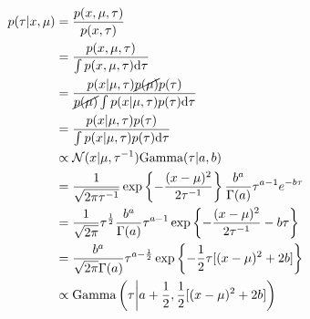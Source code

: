 \documentclass{amsmlaj}
\begin{document}
\begin{problem}
\begin{sol}
\begin{align}
		p(\tau|x,\mu)
		&=\frac{p(x,\mu,\tau)}{p(x,\tau)} \\
		&=\frac{p(x,\mu,\tau)}{\int p(x,\mu,\tau)\mathrm{d}\tau} \\
		&=\frac{p(x|\mu,\tau)\cancel{p(\mu)}p(\tau)}{\cancel{p(\mu)}\int p(x|\mu,\tau)p(\tau)\mathrm{d}\tau} \\
		&=\frac{p(x|\mu,\tau)p(\tau)}{\int p(x|\mu,\tau)p(\tau)\mathrm{d}\tau} \\
		&\propto \mathcal{N}(x|\mu,\tau^{-1}) \text{Gamma}(\tau|a,b) \\
		&=\frac{1}{\sqrt{2\pi\tau^{-1}}} \exp\left\{
			-\frac{(x-\mu)^2}{2\tau^{-1}}
		\right\} \frac{b^a}{\Gamma(a)}\tau^{a-1} e^{-b\tau} \\
		&=\frac{1}{\sqrt{2\pi}} \tau^{\frac{1}{2}} \frac{b^a}{\Gamma(a)} \tau^{a-1} \exp\left\{
			-\frac{(x-\mu)^2}{2\tau^{-1}} - b\tau
		\right\} \\
		&=\frac{b^a}{\sqrt{2\pi}\Gamma(a)} \tau^{a-\frac{1}{2}} \exp\left\{
			-\frac{1}{2}\tau[(x-\mu)^2+2b]
		\right\} \\
		&\propto \text{Gamma}\left( \tau \middle| a+\frac{1}{2}, \frac{1}{2}[(x-\mu)^2+2b] \right)
	\end{align}
\end{sol}

\end{problem}
\end{document}
